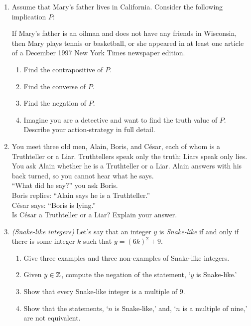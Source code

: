 \begin{exercises}{}{}
\begin{enumerate}
	\item Assume that Mary's father lives in California. Consider the following implication $P$:
	\begin{center}
	If Mary's father is an oilman and does not have any friends in Wisconsin, then Mary plays tennis or basketball, or she appeared in at least one article of a December 1997 New York Times newspaper edition.
	\end{center}
	\begin{enumerate}
	  \item Find the contrapositive of $P$.
	  \item Find the converse of $P$.
	  \item Find the negation of $P$.
	  \item Imagine you are a detective and want to find the truth value of $P$. Describe your action-strategy in full detail.
	\end{enumerate}

  \item You meet three old men, Alain, Boris, and César, each of whom is a Truthteller or a Liar. Truthtellers speak only the truth; Liars speak only lies. You ask Alain whether he is a Truthteller or a Liar. Alain answers with his back turned, so you cannot hear what he says.\\[5pt]
``What did he say?'' you ask Boris.\\[5pt]
Boris replies: ``Alain says he is a Truthteller.''\\[5pt]
César says: ``Boris is lying.''\\[5pt]
Is César a Truthteller or a Liar? Explain your answer.\goodbreak
	
  \item \emph{(Snake-like integers)} Let's say that an integer $y$ is \textit{Snake-like} if and only if there is some integer $k$ such that $y=(6k)^2+9$.
	\begin{enumerate}
	  \item Give three examples and three non-examples of Snake-like integers. 
	  \item Given $y\in\mathbb{Z}$, compute the negation of the statement, `$y$ is Snake-like.'
	  \item Show that every Snake-like integer is a multiple of $9$.
	  \item Show that the statements, `$n$ is Snake-like,' and, `$n$ is a multiple of nine,' are not equivalent.
	\end{enumerate}
	

\end{enumerate}
\end{exercises}
